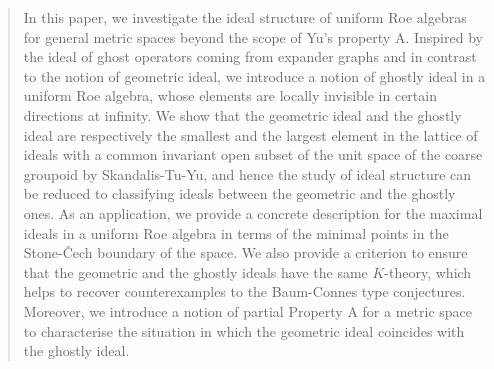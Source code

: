 \documentclass[12pt, a4paper]{amsart}
\numberwithin{equation}{section}
\theoremstyle{definition}
\theoremstyle{remark}
\begin{document}
\begin{abstract}
In this paper, we investigate the ideal structure of uniform Roe algebras for general metric spaces beyond the scope of Yu’s property A. Inspired by the ideal of ghost operators coming from expander graphs and in contrast to the notion of geometric ideal, we introduce a notion of ghostly ideal in a uniform Roe algebra, whose elements are locally invisible in certain directions at infinity. We show that the geometric ideal and the ghostly ideal are respectively the smallest and the largest element in the lattice of ideals with a common invariant open subset of the unit space of the coarse groupoid by Skandalis-Tu-Yu, and hence the study of ideal structure can be reduced to classifying ideals between the geometric and the ghostly ones. 
As an application, we provide a concrete description for the maximal ideals in a uniform Roe algebra in terms of the minimal points in the Stone-\v{C}ech boundary of the space. We also provide a criterion to ensure that the geometric and the ghostly ideals have the same $K$-theory, which helps to recover counterexamples to the Baum-Connes type conjectures. Moreover, we introduce a notion of partial Property A for a metric space to characterise the situation in which the geometric ideal coincides with the ghostly ideal.

\end{abstract}
\end{document}
